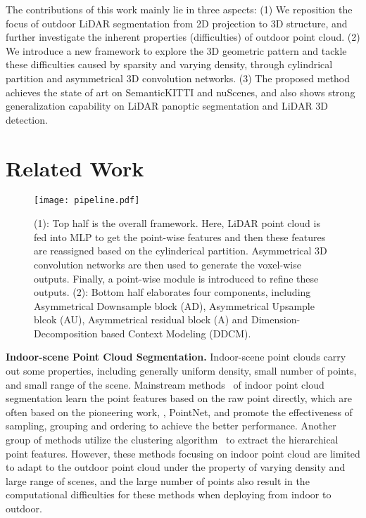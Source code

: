 \documentclass[final]{cvpr}
\begin{document}
   The contributions of this work mainly lie in three aspects:
   (1) We reposition the focus of outdoor LiDAR segmentation from 2D projection to 3D structure, and further investigate the inherent properties (difficulties) of outdoor point cloud. (2) We introduce a new framework to explore the 3D geometric pattern and tackle these difficulties caused by sparsity and varying density, through cylindrical partition and asymmetrical 3D convolution networks. (3) The proposed method achieves the state of art on SemanticKITTI and nuScenes, and also shows strong generalization capability on LiDAR panoptic segmentation and LiDAR 3D detection.
   




    


    




        




 
\section{Related Work}
   


    \begin{figure*}
    \centering
    \texttt{[image: pipeline.pdf]}
    \caption{(1): Top half is the overall framework. Here, LiDAR point cloud is fed into MLP to get the point-wise features and then these features are reassigned based on the cylinderical partition. Asymmetrical 3D convolution networks are then used to generate the voxel-wise outputs. Finally, a point-wise module is introduced to refine these outputs. (2): Bottom half elaborates four components, including Asymmetrical Downsample block (AD), Asymmetrical Upsample blcok (AU), Asymmetrical residual block (A) and Dimension-Decomposition based Context Modeling (DDCM).}
    \label{fig:pipeline}
    \end{figure*}
   
   \textbf{Indoor-scene Point Cloud Segmentation.} Indoor-scene point clouds carry out some properties, including generally uniform density, small number of points, and small range of the scene. Mainstream methods~\cite{qi2017pointnet, thomas2019kpconv, wu2019pointconv, wang2019dynamic,velivckovic2017graph, lyu2020learning, engelmann20203d, zhang2020fusion, yan2020pointasnl,wang2019graph,pham2019jsis3d,qi20173d} of indoor point cloud segmentation learn the point features based on the raw point directly, which are often based on the pioneering work, \ie, PointNet, and promote the effectiveness of sampling, grouping and ordering to achieve the better performance. Another group of methods utilize the clustering algorithm~\cite{wang2019dynamic,velivckovic2017graph} to extract the hierarchical point features. However, these methods focusing on indoor point cloud are limited to adapt to the outdoor point cloud under the property of varying density and large range of scenes, and the large number of points also result in the computational difficulties for these methods when deploying from indoor to outdoor. 
\end{document}

